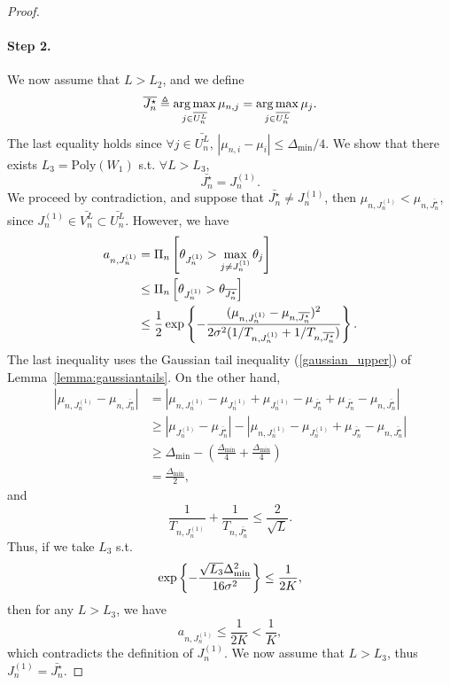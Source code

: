 \begin{proof}
    \paragraph{Step 2.} We now assume that $L > L_2$, and we define 
    \[
        \overline{J_n^\star} \triangleq \operatorname*{arg\,max}_{j\in\overline{U_n^L}} \mu_{n,j} = \operatorname*{arg\,max}_{j\in\overline{U_n^L}} \mu_j.
    \]
    The last equality holds since $\forall j \in \bar{U_n^L}$, $|\mu_{n,i}-\mu_i| \leq \Delta_{\text{min}}/4$. We show that there exists $L_3 = \text{Poly}(W_1)$ s.t. $\forall L > L_3$, 
    \[
        \bar{J_n^\star} = J_n^{(1)}.
    \] We proceed by contradiction, and suppose that $\bar{J_n^\star} \neq J_n^{(1)}$, then $\mu_{n,J_n^{(1)}} < \mu_{n,\bar{J_n^\star}}$, since $J_n^{(1)} \in \bar{V_n^L} \subset \bar{U_n^L}$. However, we have
    \begin{align*}
        a_{n,J_n^{(1)}} &= \Pi_{n}\left[\theta_{J_n^{(1)}} > \max_{j\neq J_n^{(1)}}\theta_j\right]\\
                             &\leq \Pi_{n}\left[\theta_{J_n^{(1)}} > \theta_{\overline{J_n^\star}}\right]\\
                             &\leq \frac{1}{2}\exp\left\{-\frac{(\mu_{n,J_n^{(1)}}-\mu_{n,\overline{J_n^\star}})^2}{2\sigma^2(1/T_{n,J_n^{(1)}}+1/T_{n,\overline{J_n^\star}})}\right\}.
    \end{align*}
    The last inequality uses the Gaussian tail inequality (\ref{gaussian_upper}) of Lemma~\ref{lemma:gaussiantails}. On the other hand,
    \begin{align*}
        |\mu_{n,J_n^{(1)}} - \mu_{n,\bar{J_n^\star}}| &= |\mu_{n,J_n^{(1)}} - \mu_{J_n^{(1)}} + \mu_{J_n^{(1)}} - \mu_{\bar{J_n^\star}} + \mu_{\bar{J_n^\star}} -\mu_{n,\bar{J_n^\star}}|\\
                                                      &\geq
        |\mu_{J_n^{(1)}} - \mu_{\bar{J_n^\star}}| - |\mu_{n,J_n^{(1)}} - \mu_{J_n^{(1)}} + \mu_{\bar{J_n^\star}} -\mu_{n,\bar{J_n^\star}}|\\
                                                      &\geq
        \Delta_{\text{min}} - (\frac{\Delta_{\text{min}}}{4} + \frac{\Delta_{\text{min}}}{4})\\
                                                      &=
        \frac{\Delta_{\text{min}}}{2},
    \end{align*}
    and
    \[
        \frac{1}{T_{n,J_n^{(1)}}}+\frac{1}{T_{n,\bar{J_n^\star}}} \leq \frac{2}{\sqrt{L}}.
    \]
    Thus, if we take $L_3$ s.t. 
    \[
        \exp\left\{-\frac{\sqrt{L_3}\Delta_{\text{min}}^2}{16\sigma^2}\right\} \leq \frac{1}{2K},
    \]
    then for any $L > L_3$, we have
    \[
        a_{n,J_n^{(1)}} \leq \frac{1}{2K} < \frac{1}{K},
    \]
    which contradicts the definition of $J_n^{(1)}$. We now assume that $L > L_3$, thus $J_n^{(1)}=\bar{J_n^\star}$.
    

\end{proof}
